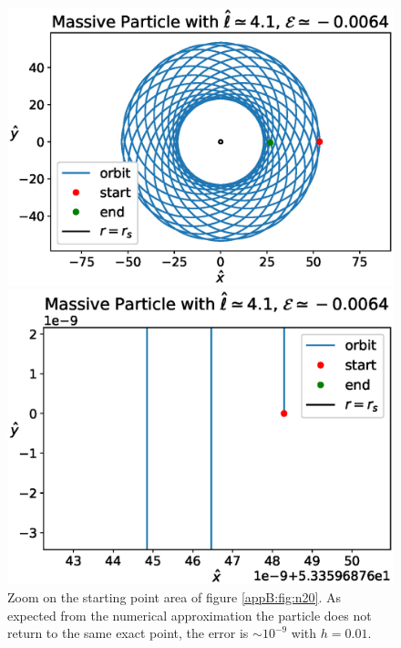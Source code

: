 \begin{figure}[h!]
    \begin{minipage}{0.49\textwidth}
        \centering
        \includegraphics[width=\textwidth]{Figures/appendixB/beautiful20.eps}
        \caption{$\hat \ell = 4.12, ~ \mathcal E = -0.0064453981$, \\
        $\delta \phi = \pi / 10$ \\ \\ \\}
        \label{appB:fig:n20}
    \end{minipage}
    \hspace{0.01\textwidth}
    \begin{minipage}{0.49\textwidth}
        \centering
        \includegraphics[width=\textwidth]{Figures/appendixB/beautiful20_err.eps}
        \caption{Zoom on the starting point area of figure \ref{appB:fig:n20}.
        As expected from the numerical approximation the particle does not
        return to the same exact point, the error is $\sim 10^{-9}$ with $h = 0.01$.}
        \label{appB:fig:n20_err}
    \end{minipage}
\end{figure}

